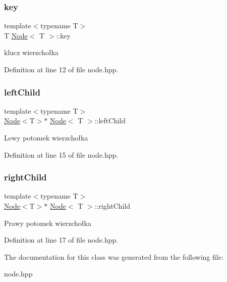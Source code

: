 \subsubsection{\texorpdfstring{key}{key}}
{\footnotesize\ttfamily template$<$typename T$>$ \\
T \hyperlink{classNode}{Node}$<$ T $>$\+::key\hspace{0.3cm}{\ttfamily [private]}}

klucz wierzchołka 

Definition at line 12 of file node.\+hpp.

\mbox{\label{classNode_a2eaaeffaeef97da6291b788fa131c9ec}} 
\subsubsection{\texorpdfstring{left\+Child}{leftChild}}
{\footnotesize\ttfamily template$<$typename T$>$ \\
\hyperlink{classNode}{Node}$<$T$>$$\ast$ \hyperlink{classNode}{Node}$<$ T $>$\+::left\+Child}

Lewy potomek wierzchołka 

Definition at line 15 of file node.\+hpp.

\mbox{\label{classNode_a625cff56d169157a568afaedbb11576b}} 
\subsubsection{\texorpdfstring{right\+Child}{rightChild}}
{\footnotesize\ttfamily template$<$typename T$>$ \\
\hyperlink{classNode}{Node}$<$T$>$$\ast$ \hyperlink{classNode}{Node}$<$ T $>$\+::right\+Child}

Prawy potomek wierzchołka 

Definition at line 17 of file node.\+hpp.



The documentation for this class was generated from the following file\+:\begin{DoxyCompactItemize}
\item 
node.\+hpp\end{DoxyCompactItemize}
